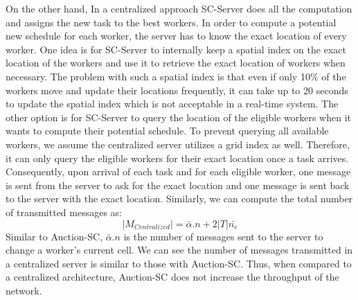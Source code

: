 On the other hand, In a centralized approach SC-Server does all the computation and assigns the new task to the best workers. In order to compute a potential new schedule for each worker, the server has to know the exact location of every worker. One idea is for SC-Server to internally keep a spatial index on the exact location of the workers and use it to retrieve the exact location of workers when necessary. The problem with such a spatial index is that even if only 10\% of the workers move and update their locations frequently, it can take up to 20 seconds to update the spatial index \cite{Akdogan14} which is not acceptable in a real-time system. The other option is for SC-Server to query the location of the eligible workers when it wants to compute their potential schedule. To prevent querying all available workers, we assume the centralized server utilizes a grid index as well. Therefore, it can only query the eligible workers for their exact location once a task arrives. Consequently, upon arrival of each task and for each eligible worker, one message is sent from the server to ask for the exact location and one message is sent back to the server with the exact location. Similarly, we can compute the total number of transmitted messages as:
\begin{equation*}
\left| M_{Centralized} \right| = \bar{\alpha}.n + 2|T|\bar{n_e}
\end{equation*}
\noindent Similar to Auction-SC, $\bar{\alpha}.n$ is the number of messages sent to the server to change a worker's current cell. We can see the number of messages transmitted in a centralized server is similar to those with Auction-SC. Thus, when compared to a centralized architecture, Auction-SC does not increase the throughput of the network.